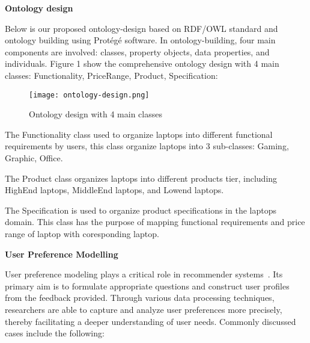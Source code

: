 \begin{flushleft}
	\textbf{Ontology design}
\end{flushleft}
Below is our proposed ontology-design based on RDF/OWL standard and ontology building using Protégé software. In ontology-building, four main components are involved: classes, property objects, data properties, and individuals. Figure 1 show the comprehensive ontology design with 4 main classes: Functionality, PriceRange, Product, Specification:

\begin{figure}[htbp]
	\centering
	\texttt{[image: ontology-design.png]}
	\caption{Ontology design with 4 main classes}
	\label{fig:sample}
\end{figure}

The Functionality class used to organize laptops into different functional requirements by users, this class organize laptops into 3 sub-classes: Gaming, Graphic, Office.

The Product class organizes laptops into different products tier, including HighEnd laptops, MiddleEnd laptops, and Lowend laptops.

The Specification is used to organize product specifications in the laptops domain. This class has the purpose of mapping functional requirements and price range of laptop with coresponding laptop.

\begin{flushleft}
	\textbf{User Preference Modelling}
\end{flushleft}
User preference modeling plays a critical role in recommender systems~\parencite{ayundhita2019}. Its primary aim is to formulate appropriate questions and construct user profiles from the feedback provided. Through various data processing techniques, researchers are able to capture and analyze user preferences more precisely, thereby facilitating a deeper understanding of user needs. Commonly discussed cases include the following:

